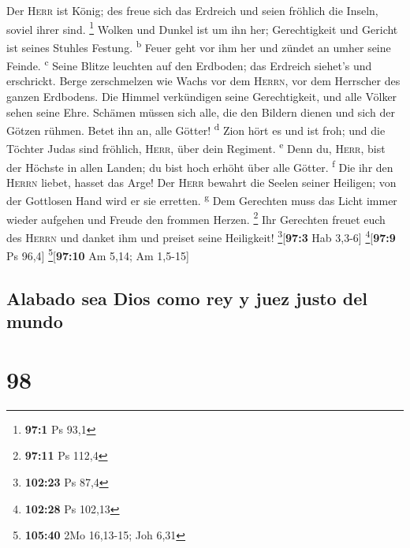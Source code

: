  Der \textsc{Herr} ist König; des freue sich das Erdreich
und seien fröhlich die Inseln, soviel ihrer sind. \footnote{\textbf{97:1}
  Ps 93,1}  Wolken und Dunkel ist um ihn her;
Gerechtigkeit und Gericht ist seines Stuhles Festung.
\textsuperscript{b}  Feuer geht vor ihm her und zündet an
umher seine Feinde. \textsuperscript{c}  Seine Blitze
leuchten auf den Erdboden; das Erdreich siehet's und erschrickt.
 Berge zerschmelzen wie Wachs vor dem \textsc{Herrn}, vor
dem Herrscher des ganzen Erdbodens.  Die Himmel
verkündigen seine Gerechtigkeit, und alle Völker sehen seine Ehre.
 Schämen müssen sich alle, die den Bildern dienen und sich
der Götzen rühmen. Betet ihn an, alle Götter! \textsuperscript{d}
 Zion hört es und ist froh; und die Töchter Judas sind
fröhlich, \textsc{Herr}, über dein Regiment. \textsuperscript{e}
 Denn du, \textsc{Herr}, bist der Höchste in allen Landen;
du bist hoch erhöht über alle Götter. \textsuperscript{f}
 Die ihr den \textsc{Herrn} liebet, hasset das Arge! Der
\textsc{Herr} bewahrt die Seelen seiner Heiligen; von der Gottlosen Hand
wird er sie erretten. \textsuperscript{g}  Dem Gerechten
muss das Licht immer wieder aufgehen und Freude den frommen Herzen.
\footnote{\textbf{97:11} Ps 112,4}  Ihr Gerechten freuet
euch des \textsc{Herrn} und danket ihm und preiset seine Heiligkeit!
\footnote{\textbf{102:23} Ps 87,4}{[}\textbf{97:3} Hab 3,3-6{]}
\footnote{\textbf{102:28} Ps 102,13}{[}\textbf{97:9} Ps 96,4{]}
\footnote{\textbf{105:40} 2Mo 16,13-15; Joh 6,31}{[}\textbf{97:10} Am
5,14; Am 1,5-15{]}

\hypertarget{alabado-sea-dios-como-rey-y-juez-justo-del-mundo}{%
\subsection{Alabado sea Dios como rey y juez justo del
mundo}\label{alabado-sea-dios-como-rey-y-juez-justo-del-mundo}}

\hypertarget{section-97}{%
\section{98}\label{section-97}}

